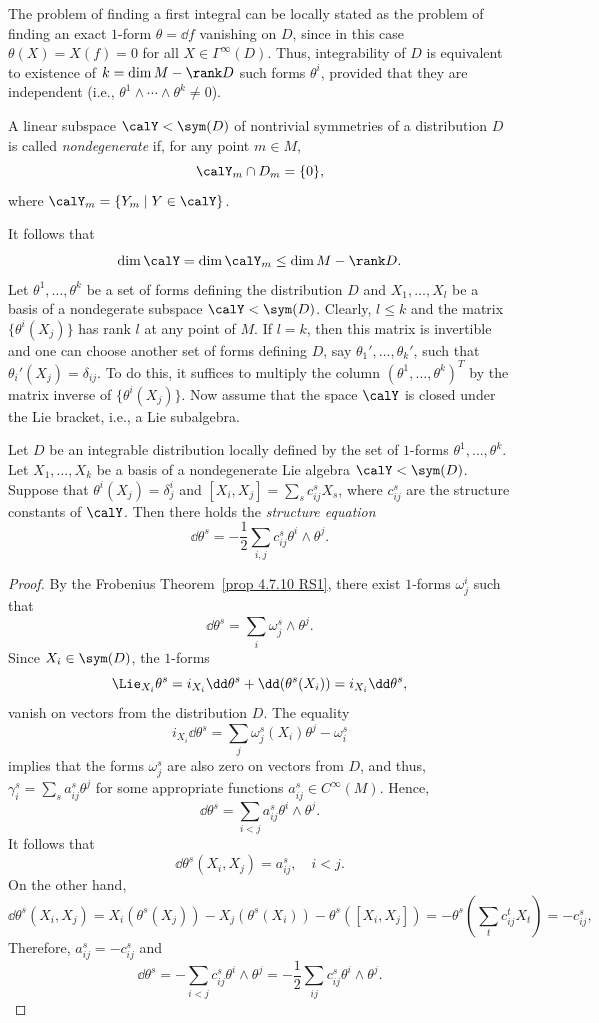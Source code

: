 The problem of finding a first integral can be locally stated as the problem of finding an exact $1$-form $\theta=\dd f$ vanishing on $D$, since in this case $\theta(X)=X(f)=0$ for all $X\in\Gamma^\infty(D)$. Thus, integrability of $D$ is equivalent to existence of $k=\dim M-\rank D$ such forms $\theta^i$, provided that they are independent (i.e., $\theta^1\wedge\cdots\wedge\theta^k\neq 0$).

\begin{defn}
    A linear subspace $\calY<\sym(D)$ of nontrivial symmetries of a distribution $D$ is called \emph{nondegenerate} if, for any point $m\in M$, 
    \[\calY_m\cap D_m=\{0\},\]
    where $\calY_m=\{Y_m\mid Y\in\calY\}$.
\end{defn}

It follows that 
\[\dim \calY=\dim \calY_m\leq \dim M-\rank D.\]
Let $\theta^1,\ldots,\theta^k$ be a set of forms defining the distribution $D$ and $X_1,\ldots,X_l$ be a basis of a nondegerate subspace $\calY<\sym(D)$. Clearly, $l\leq k$ and the matrix $\{\theta^i(X_j)\}$ has rank $l$ at any point of $M$. If $l=k$, then this matrix is invertible and one can choose another set of forms defining $D$, say $\theta_1',\ldots,\theta_k'$, such that $\theta_i'(X_j)=\delta_{ij}$. To do this, it suffices to multiply the column $(\theta^1,\ldots,\theta^k)^T$ by the matrix inverse of $\{\theta^i(X_j)\}$. Now assume that the space $\calY$ is closed under the Lie bracket, i.e., a Lie subalgebra.

\begin{thm}\label{thm 4.1 Kras}
    Let $D$ be an integrable distribution locally defined by the set of $1$-forms $\theta^1,\ldots,\theta^k$. Let $X_1,\ldots,X_k$ be a basis of a nondegenerate Lie algebra $\calY<\sym(D)$. Suppose that $\theta^i(X_j)=\delta^i_{j}$ and $[X_i,X_j]=\sum_s c^s_{ij}X_s$, where $c^s_{ij}$ are the structure constants of $\calY$. Then there holds the \emph{structure equation}
    \[\dd\theta^s=-\frac12\sum_{i,j}c^s_{ij}\theta^i\wedge\theta^j.\]
\end{thm}
\begin{proof}
    By the Frobenius Theorem~\ref{prop 4.7.10 RS1}, there exist $1$-forms $\omega^i_j$ such that 
    \[\dd\theta^s=\sum_i\omega^s_{j}\wedge\theta^j.\]
    Since $X_i\in\sym(D)$, the $1$-forms 
    \[\Lie_{X_i}\theta^s=i_{X_i}\dd\theta^s+\dd(\theta^s(X_i))=i_{X_i}\dd \theta^s,\]
    vanish on vectors from the distribution $D$. The equality
    \[i_{X_i}\dd\theta^s=\sum_j\omega^s_j(X_i)\theta^j-\omega^s_i\]
    implies that the forms $\omega^s_j$ are also zero on vectors from $D$, and thus, $\gamma^s_i=\sum_s a^s_{ij}\theta^j$ for some appropriate functions $a^s_{ij}\in C^\infty(M)$. Hence, 
    \[\dd\theta^s=\sum_{i<j}a^s_{ij}\theta^i\wedge\theta^j.\]
    It follows that 
    \[\dd\theta^s(X_i,X_j)=a^s_{ij},\quad i<j.\]
    On the other hand, 
    \[\dd\theta^s(X_i,X_j)=X_i(\theta^s(X_j))-X_j(\theta^s(X_i))-\theta^s([X_i,X_j])=-\theta^s\left(\sum_t c^t_{ij}X_t\right)=-c^s_{ij},\]
    Therefore, $a^s_{ij}=-c^s_{ij}$ and 
    \[\dd\theta^s=-\sum_{i<j}c^s_{ij}\theta^i\wedge\theta^j=-\frac12\sum_{ij}c^s_{ij}\theta^i\wedge\theta^j.\]
\end{proof}

